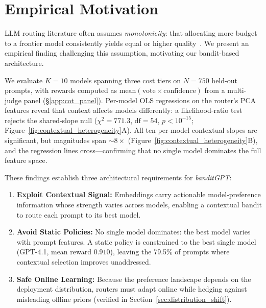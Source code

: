 \section{Empirical Motivation}
\label{sec:motivation}

LLM routing literature often assumes \emph{monotonicity}: that allocating more budget to a frontier model consistently yields equal or higher quality~\cite{ong2024routellm, chen2023frugalgpt}.
We present an empirical finding challenging this assumption, motivating our bandit-based architecture.

We evaluate $K{=}10$ models spanning three cost tiers on $N{=}750$ held-out prompts, with rewards computed as $\text{mean}(\text{vote} \times \text{confidence})$ from a multi-judge panel (\S\ref{app:cot_panel}).
Per-model OLS regressions on the router's PCA features reveal that context affects models differently: a likelihood-ratio test rejects the shared-slope null ($\chi^2 = 771.3$, $\text{df}{=}54$, $p < 10^{-15}$; Figure~\ref{fig:contextual_heterogeneity}A).
All ten per-model contextual slopes are significant, but magnitudes span ${\sim}8\times$ (Figure~\ref{fig:contextual_heterogeneity}B), and the regression lines cross---confirming that no single model dominates the full feature space.



These findings establish three architectural requirements for \textit{banditGPT}:
\begin{enumerate}[noitemsep,topsep=2pt,leftmargin=*]
    \item \textbf{Exploit Contextual Signal:} Embeddings carry actionable model-preference information whose strength varies across models, enabling a contextual bandit to route each prompt to its best model.
    \item \textbf{Avoid Static Policies:} No single model dominates: the best model varies with prompt features. A static policy is constrained to the best single model (GPT-4.1, mean reward $0.910$), leaving the 79.5\% of prompts where contextual selection improves unaddressed.
    \item \textbf{Safe Online Learning:} Because the preference landscape depends on the deployment distribution, routers must adapt online while hedging against misleading offline priors (verified in Section~\ref{sec:distribution_shift}).
\end{enumerate}
